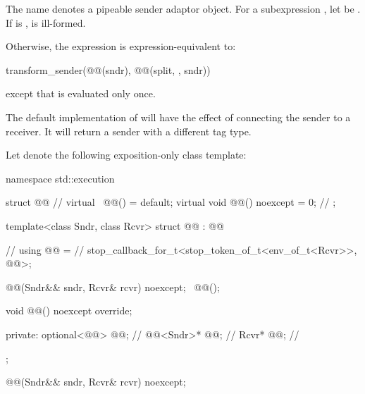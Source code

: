 \pnum
The name  denotes a pipeable sender adaptor object.
For a subexpression , let  be .
If  is ,
 is ill-formed.

\pnum
Otherwise, the expression  is expression-equivalent to:
\begin{codeblock}
transform_sender(@@(sndr), @@(split, {}, sndr))
\end{codeblock}
except that  is evaluated only once.
\begin{note}
The default implementation of 
will have the effect of connecting the sender to a receiver.
It will return a sender with a different tag type.
\end{note}

\pnum
Let  denote the following exposition-only class template:

\begin{codeblock}
namespace std::execution {
  struct @@ {                                     // \expos
    virtual ~@@() = default;
    virtual void @@() noexcept = 0;                         // \expos
  };

  template<class Sndr, class Rcvr>
  struct @@ : @@ {                       // \expos
    using @@ =                                    // \expos
      stop_callback_for_t<stop_token_of_t<env_of_t<Rcvr>>, @@>;

    @@(Sndr&& sndr, Rcvr& rcvr) noexcept;
    ~@@();

    void @@() noexcept override;

  private:
    optional<@@> @@;                         // \expos
    @@<Sndr>* @@;                               // \expos
    Rcvr* @@;                                                 // \expos
  };
}
\end{codeblock}

\begin{itemdecl}
@@(Sndr&& sndr, Rcvr& rcvr) noexcept;
\end{itemdecl}

